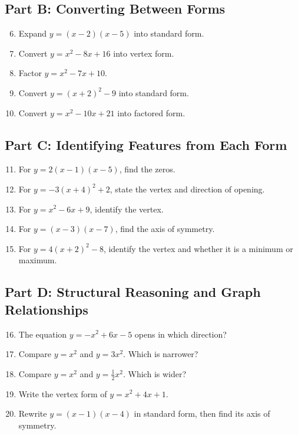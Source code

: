 \documentclass[14pt]{extarticle}
\begin{document}
\subsection*{Part B: Converting Between Forms}
\begin{enumerate}
  \setcounter{enumi}{5}
  \item Expand \(y = (x - 2)(x - 5)\) into standard form.
  \item Convert \(y = x^2 - 8x + 16\) into vertex form.
  \item Factor \(y = x^2 - 7x + 10\).
  \item Convert \(y = (x + 2)^2 - 9\) into standard form.
  \item Convert \(y = x^2 - 10x + 21\) into factored form.
\end{enumerate}

\subsection*{Part C: Identifying Features from Each Form}
\begin{enumerate}
  \setcounter{enumi}{10}
  \item For \(y = 2(x - 1)(x - 5)\), find the zeros.
  \item For \(y = -3(x + 4)^2 + 2\), state the vertex and direction of opening.
  \item For \(y = x^2 - 6x + 9\), identify the vertex.
  \item For \(y = (x - 3)(x - 7)\), find the axis of symmetry.
  \item For \(y = 4(x + 2)^2 - 8\), identify the vertex and whether it is a minimum or maximum.
\end{enumerate}

\subsection*{Part D: Structural Reasoning and Graph Relationships}
\begin{enumerate}
  \setcounter{enumi}{15}
  \item The equation \(y = -x^2 + 6x - 5\) opens in which direction?
  \item Compare \(y = x^2\) and \(y = 3x^2\). Which is narrower?
  \item Compare \(y = x^2\) and \(y = \tfrac{1}{2}x^2\). Which is wider?
  \item Write the vertex form of \(y = x^2 + 4x + 1\).
  \item Rewrite \(y = (x - 1)(x - 4)\) in standard form, then find its axis of symmetry.
\end{enumerate}
\end{document}
